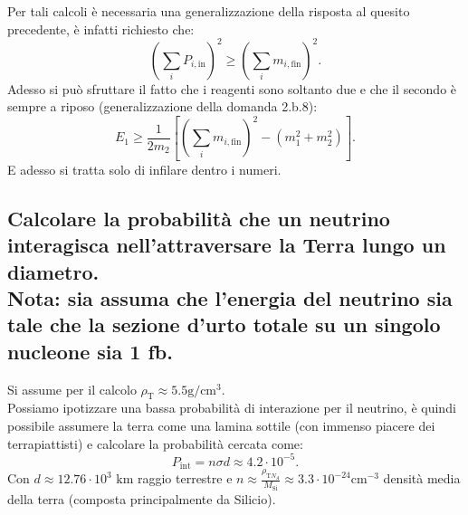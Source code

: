 Per tali calcoli è necessaria una generalizzazione della risposta al quesito precedente, è infatti richiesto che:
\[
	\left( \sum_i P_{i,\text{in}} \right)^2 \ge \left(\sum_{i} m_{i, \text{fin}} \right)^2  
.\] 
Adesso si può sfruttare il fatto che i reagenti sono soltanto due e che il secondo è sempre a riposo (generalizzazione della domanda 2.b.8):
\[
	E_1 \ge \frac{1}{2m_2}\left[ \left( \sum_{i} m_{i, \text{fin}} \right)^2 - \left( m_1^2 + m_2^2 \right)  \right] 
.\]
E adesso si tratta solo di infilare dentro i numeri.

\subsection[]{ Calcolare la probabilità che un neutrino interagisca nell’attraversare la Terra lungo un diametro.\\
Nota: sia assuma che l’energia del neutrino sia tale che la sezione d’urto totale su un singolo nucleone sia 1 fb. } 
Si assume per il calcolo $\rho_{\text{T}} \approx 5.5 \text{g}/\text{cm}^3$.\\
Possiamo ipotizzare una bassa probabilità di interazione per il neutrino, è quindi possibile assumere la terra come una lamina sottile (con immenso piacere dei terrapiattisti) e calcolare la probabilità cercata come:
\[
P_{\text{int}} = n \sigma d \approx 4.2 \cdot 10^{-5} 
.\] 
Con $d \approx 12.76 \cdot 10^{3} \text{ km}$ raggio terrestre e $n \approx \frac{\rho_{\text{T}N_A}}{M_{\text{Si}}} \approx 3.3 \cdot 10^{-24} \text{cm}^{-3}$ densità media della terra (composta principalmente da Silicio).

